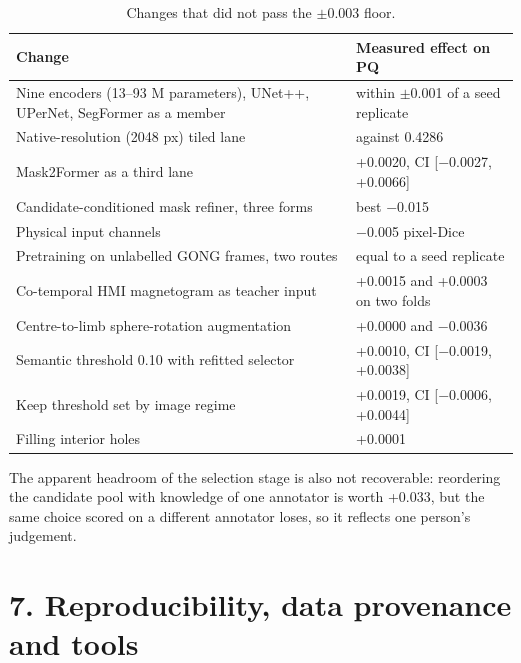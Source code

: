 \begin{table}[t]
\centering\footnotesize
\caption{Changes that did not pass the $\pm$0.003 floor.}
\begin{tabular}{@{}
  >{\raggedright\arraybackslash}p{}
  >{\raggedright\arraybackslash}p{}@{}}
\toprule
\begin{minipage}[b]{\linewidth}\raggedright
Change
\end{minipage} & \begin{minipage}[b]{\linewidth}\raggedright
Measured effect on PQ
\end{minipage} \\
\midrule
Nine encoders (13--93 M parameters), UNet++, UPerNet, SegFormer as a member & within $\pm$0.001 of a seed replicate \\
Native-resolution (2048 px) tiled lane & 0.4277 against 0.4286 \\
Mask2Former as a third lane & +0.0020, CI {[}$-$0.0027, +0.0066{]} \\
Candidate-conditioned mask refiner, three forms & best $-$0.015 \\
Physical input channels & $-$0.005 pixel-Dice \\
Pretraining on unlabelled GONG frames, two routes & equal to a seed replicate \\
Co-temporal HMI magnetogram as teacher input & +0.0015 and +0.0003 on two folds \\
Centre-to-limb sphere-rotation augmentation & +0.0000 and $-$0.0036 \\
Semantic threshold 0.10 with refitted selector & +0.0010, CI {[}$-$0.0019, +0.0038{]} \\
Keep threshold set by image regime & +0.0019, CI {[}$-$0.0006, +0.0044{]} \\
Filling interior holes & +0.0001 \\
\bottomrule
\end{tabular}
\end{table}

The apparent headroom of the selection stage is also not recoverable: reordering the candidate
pool with knowledge of one annotator is worth +0.033, but the same choice scored on a different
annotator loses, so it reflects one person's judgement.

\section{7. Reproducibility, data provenance and tools}\label{reproducibility-data-provenance-and-tools}

